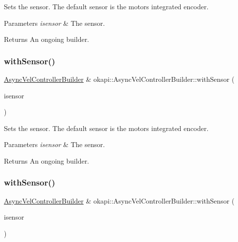 Sets the sensor. The default sensor is the motor\textquotesingle{}s integrated encoder.


\begin{DoxyParams}{Parameters}
{\em isensor} & The sensor. \\
\hline
\end{DoxyParams}
\begin{DoxyReturn}{Returns}
An ongoing builder. 
\end{DoxyReturn}
\mbox{\label{classokapi_1_1AsyncVelControllerBuilder_a3f21552feaedb4592289c32d3cd20b05}} 
\subsubsection{\texorpdfstring{withSensor()}{withSensor()}\hspace{0.1cm}{\footnotesize\ttfamily [2/3]}}
{\footnotesize\ttfamily \mbox{\hyperlink{classokapi_1_1AsyncVelControllerBuilder}{Async\+Vel\+Controller\+Builder}} \& okapi\+::\+Async\+Vel\+Controller\+Builder\+::with\+Sensor (\begin{DoxyParamCaption}\item[{const \mbox{\hyperlink{classokapi_1_1IntegratedEncoder}{Integrated\+Encoder}} \&}]{isensor }\end{DoxyParamCaption})}

Sets the sensor. The default sensor is the motor\textquotesingle{}s integrated encoder.


\begin{DoxyParams}{Parameters}
{\em isensor} & The sensor. \\
\hline
\end{DoxyParams}
\begin{DoxyReturn}{Returns}
An ongoing builder. 
\end{DoxyReturn}
\mbox{\label{classokapi_1_1AsyncVelControllerBuilder_a4bfe71bea3ec45c6b10ec66047b06c4c}} 
\subsubsection{\texorpdfstring{withSensor()}{withSensor()}\hspace{0.1cm}{\footnotesize\ttfamily [3/3]}}
{\footnotesize\ttfamily \mbox{\hyperlink{classokapi_1_1AsyncVelControllerBuilder}{Async\+Vel\+Controller\+Builder}} \& okapi\+::\+Async\+Vel\+Controller\+Builder\+::with\+Sensor (\begin{DoxyParamCaption}\item[{const std\+::shared\+\_\+ptr$<$ \mbox{\hyperlink{classokapi_1_1RotarySensor}{Rotary\+Sensor}} $>$ \&}]{isensor }\end{DoxyParamCaption})}

